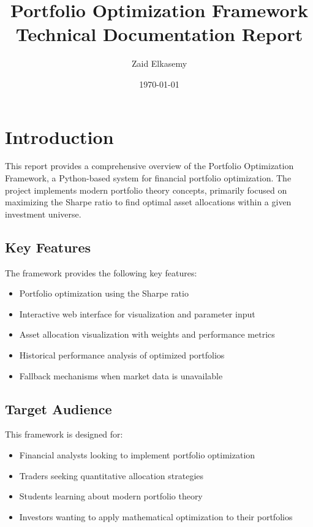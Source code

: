 \documentclass[11pt,a4paper]{article}
\title{\textbf{Portfolio Optimization Framework}\\
       \large Technical Documentation Report}
\author{Zaid Elkasemy}
\date{\today}
\begin{document}
\maketitle
\tableofcontents
\newpage

\section{Introduction}

This report provides a comprehensive overview of the Portfolio Optimization Framework, a Python-based system for financial portfolio optimization. The project implements modern portfolio theory concepts, primarily focused on maximizing the Sharpe ratio to find optimal asset allocations within a given investment universe.

\subsection{Key Features}

The framework provides the following key features:

\begin{itemize}
    \item Portfolio optimization using the Sharpe ratio
    \item Interactive web interface for visualization and parameter input
    \item Asset allocation visualization with weights and performance metrics
    \item Historical performance analysis of optimized portfolios
    \item Fallback mechanisms when market data is unavailable
\end{itemize}

\subsection{Target Audience}

This framework is designed for:

\begin{itemize}
    \item Financial analysts looking to implement portfolio optimization
    \item Traders seeking quantitative allocation strategies
    \item Students learning about modern portfolio theory
    \item Investors wanting to apply mathematical optimization to their portfolios
\end{itemize}
\end{document}
